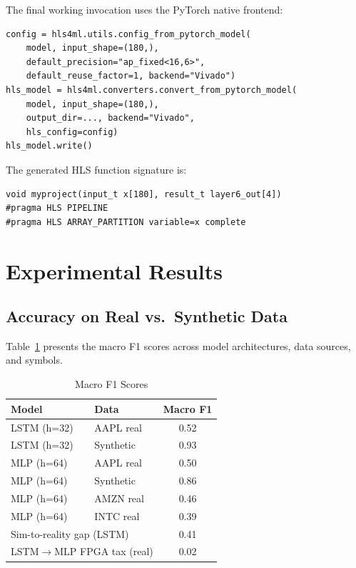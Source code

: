 \documentclass[conference]{IEEEtran}
\begin{document}
The final working invocation uses the PyTorch native frontend:
\begin{verbatim}
config = hls4ml.utils.config_from_pytorch_model(
    model, input_shape=(180,),
    default_precision="ap_fixed<16,6>",
    default_reuse_factor=1, backend="Vivado")
hls_model = hls4ml.converters.convert_from_pytorch_model(
    model, input_shape=(180,),
    output_dir=..., backend="Vivado",
    hls_config=config)
hls_model.write()
\end{verbatim}

The generated HLS function signature is:
\begin{verbatim}
void myproject(input_t x[180], result_t layer6_out[4])
#pragma HLS PIPELINE
#pragma HLS ARRAY_PARTITION variable=x complete
\end{verbatim}


\section{Experimental Results}
\label{sec:results}

\subsection{Accuracy on Real vs.\ Synthetic Data}
Table~\ref{tab:results} presents the macro F1 scores across model architectures,
data sources, and symbols.

\begin{table}[h]
  \centering
  \caption{Macro F1 Scores}
  \label{tab:results}
  \begin{tabular}{llc}
    \toprule
    Model & Data & Macro F1 \\
    \midrule
    LSTM (h=32) & AAPL real  & 0.52 \\
    LSTM (h=32) & Synthetic  & 0.93 \\
    MLP (h=64)  & AAPL real  & 0.50 \\
    MLP (h=64)  & Synthetic  & 0.86 \\
    MLP (h=64)  & AMZN real  & 0.46 \\
    MLP (h=64)  & INTC real  & 0.39 \\
    \midrule
    \multicolumn{2}{l}{Sim-to-reality gap (LSTM)} & 0.41 \\
    \multicolumn{2}{l}{LSTM$\to$MLP FPGA tax (real)} & 0.02 \\
    \bottomrule
  \end{tabular}
\end{table}
\end{document}
